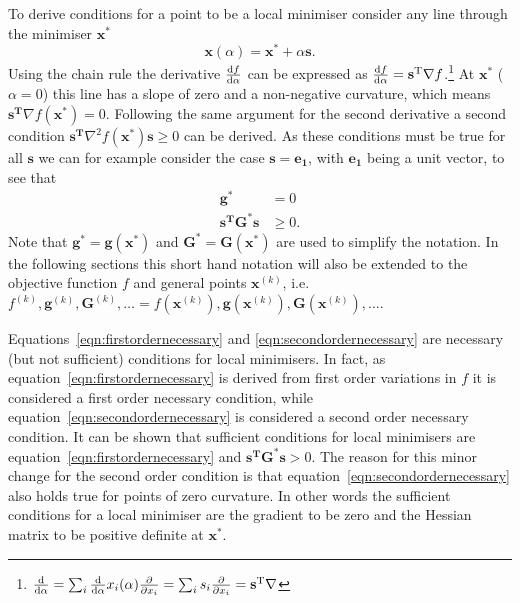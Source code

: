 To derive conditions for a point to be a local minimiser consider any line
through the minimiser $\mathbf{x^*}$
%
\begin{equation}
    \mathbf{x}(\alpha)=\mathbf{x^*}+\alpha\mathbf{s}.
\end{equation}
%
Using the chain rule the derivative $\dv{f}{\alpha}$ can be expressed as
$\dv{f}{\alpha}=\mathbf{s^\text{T}}\nabla
f$.\footnote{$\dv{\alpha}=\sum_i\dv{\alpha}x_i(\alpha)\pdv{x_i}=\sum_i
s_i\pdv{x_i}=\mathbf{s^\text{T}}\nabla$} At $\mathbf{x^*}$ ($\alpha=0$) this
line has a slope of zero and a non-negative curvature, which means
$\mathbf{s^\text{T}}\nabla f(\mathbf{x^*})=0$. Following the same argument for
the second derivative a second condition $\mathbf{s^\text{T}}\nabla^2
f(\mathbf{x^*})\mathbf{s}\geq 0$ can be derived. As these conditions must be
true for all $\mathbf{s}$ we can for example consider the case
$\mathbf{s}=\mathbf{e_1}$, with $\mathbf{e_1}$ being a unit vector, to see that
%
\begin{align}
    \mathbf{g^*}&=0\label{eqn:firstordernecessary}\\
    \mathbf{s^\text{T}}\mathbf{G^*}\mathbf{s}&\geq 0.\label{eqn:secondordernecessary}
\end{align}
%
Note that $\mathbf{g^*}=\mathbf{g}(\mathbf{x^*})$ and
$\mathbf{G^*}=\mathbf{G}(\mathbf{x^*})$ are used to simplify the notation. In
the following sections this short hand notation will also be extended to the
objective function $f$ and general points $\mathbf{x}^{(k)}$, i.e.
$f^{(k)},\mathbf{g}^{(k)},\mathbf{G}^{(k)},\dots=f\left(\mathbf{x}^{(k)}\right),\mathbf{g}\left(\mathbf{x}^{(k)}\right),\mathbf{G}\left(\mathbf{x}^{(k)}\right),\dots$.

Equations~\eqref{eqn:firstordernecessary} and \eqref{eqn:secondordernecessary}
are necessary (but not sufficient) conditions for local minimisers. In fact, as
equation~\eqref{eqn:firstordernecessary} is derived from first order variations
in $f$ it is considered a first order necessary condition, while
equation~\eqref{eqn:secondordernecessary} is considered a second order
necessary condition. It can be shown that sufficient conditions for local
minimisers are equation~\eqref{eqn:firstordernecessary} and
$\mathbf{s^\text{T}}\mathbf{G^*}\mathbf{s}>
0$.\autocite{Fletcher_Practicalmethodsoptimization_1987} The reason for this
minor change for the second order condition is that
equation~\eqref{eqn:secondordernecessary} also holds true for points of zero
curvature. In other words the sufficient conditions for a local minimiser are
the gradient to be zero and the Hessian matrix to be positive definite at
$\mathbf{x^*}$.

